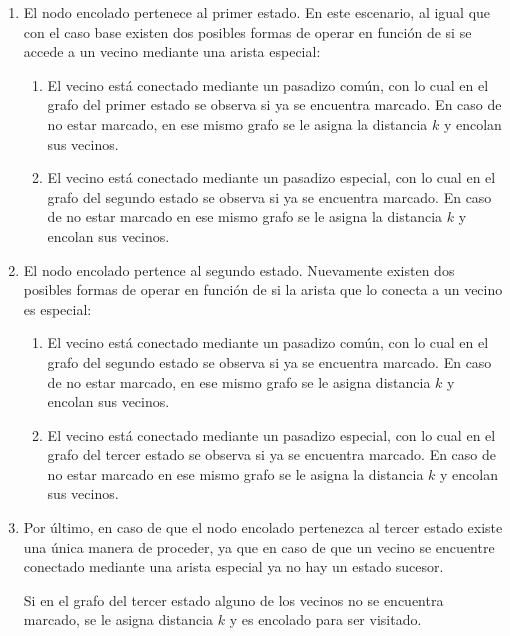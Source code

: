 	\begin{enumerate}
		\item{
			El nodo encolado pertenece al primer estado. En este escenario, al
			igual que con el caso base existen dos posibles formas de operar en
			función de si se accede a un vecino mediante una arista especial:

			\begin{enumerate}
				\item{
					El vecino está conectado mediante un pasadizo común, con lo
					cual en el grafo del primer estado se observa si ya se
					encuentra marcado. En caso de no estar marcado, en ese
					mismo grafo se le asigna la distancia $k$ y encolan sus
					vecinos.
				}
				\item{
					El vecino está conectado mediante un pasadizo especial, con
					lo cual en el grafo del segundo estado se observa si ya se
					encuentra marcado. En caso de no estar marcado en ese mismo
					grafo se le asigna la distancia $k$ y encolan sus vecinos.
				}
			\end{enumerate}
		}
		\item{
			El nodo encolado pertence al segundo estado. Nuevamente existen dos
			posibles formas de operar en función de si la arista que lo conecta
			a un vecino es especial:

			\begin{enumerate}
				\item{
					El vecino está conectado mediante un pasadizo común, con lo
					cual en el grafo del segundo estado se observa si ya se
					encuentra marcado. En caso de no estar marcado, en ese mismo
					grafo se le asigna distancia $k$ y encolan sus vecinos.
				}
				\item{
					El vecino está conectado mediante un pasadizo especial, con
					lo cual en el grafo del tercer estado se observa si ya se
					encuentra marcado. En caso de no estar marcado en ese mismo
					grafo se le asigna la distancia $k$ y encolan sus vecinos.
				}
			\end{enumerate}
		}
		\item{
			Por último, en caso de que el nodo encolado pertenezca al tercer
			estado existe una única manera de proceder, ya que en caso de que un
			vecino se encuentre conectado mediante una arista especial ya no hay
			un estado sucesor.

			Si en el grafo del tercer estado alguno de los vecinos no se
			encuentra marcado, se le asigna distancia $k$ y es encolado para ser
			visitado.
		}
	\end{enumerate}

